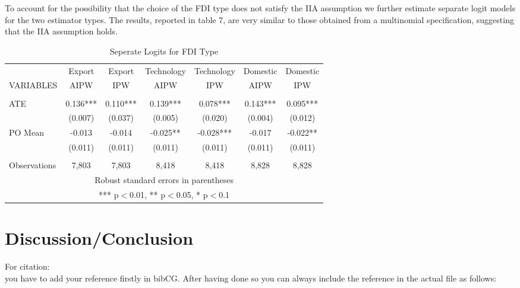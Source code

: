 \documentclass[a4paper,11pt]{scrartcl}
\begin{document}
To account for the possibility that the choice of the FDI type does not satisfy the IIA assumption we further estimate separate logit models for the two estimator types. The results, reported in table 7, are very similar to those obtained from a multinomial specification, suggesting that the IIA assumption holds.  


\begin{table}[htbp]\centering
\caption{Seperate Logits for FDI Type}
\begin{tabular}{lcccccc} \hline
 & Export   &Export  & Technology  &Technology  & Domestic  & Domestic  \\
VARIABLES & AIPW & IPW & AIPW & IPW & AIPW & IPW  \\ \hline
 &  &  &  &  &  &  \\
ATE  &0.136*** &   0.110*** &   0.139*** &   0.078*** &   0.143***   & 0.095***   \\
 & (0.007) &  (0.037)   & (0.005)   & (0.020) & (0.004) & (0.012)  \\
PO Mean &   -0.013 &   -0.014 &   -0.025** &   -0.028***   & -0.017 &   -0.022** \\
 &   (0.011) &   (0.011) &  (0.011)   & (0.011)   & (0.011)  & (0.011) \\
 &  &  &  &  &  & \\
 Observations & 7,803  & 7,803&  8,418 & 8,418  &  8,828  & 8,828 \\ \hline
\multicolumn{7}{c}{ Robust standard errors in parentheses} \\
\multicolumn{7}{c}{ *** p$<$0.01, ** p$<$0.05, * p$<$0.1} \\
\end{tabular}
\end{table}



\section{Discussion/Conclusion}
For citation: \\
you have to add your reference firstly in bibCG. After having done so you can always include the reference in the actual file as follows: \\
 \citet{biddle1990sleep}\\
\citep[p.~35]{CaliendoHujerThomsen2008}	 \\
\end{document}
